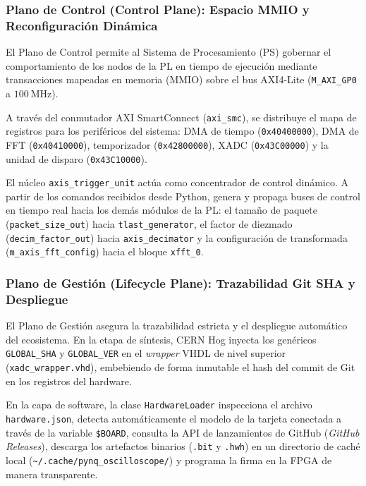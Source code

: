 \documentclass[standalone]{subfiles}
\begin{document}
\subsubsection{Plano de Control (Control Plane): Espacio MMIO y Reconfiguración Dinámica}
\label{subsubsec:plano_control}

El Plano de Control permite al Sistema de Procesamiento (PS) gobernar el comportamiento de los nodos de la PL en tiempo de ejecución mediante transacciones mapeadas en memoria (MMIO) sobre el bus AXI4-Lite (\texttt{M\_AXI\_GP0} a $100~\text{MHz}$). 

A través del conmutador AXI SmartConnect (\texttt{axi\_smc}), se distribuye el mapa de registros para los periféricos del sistema: DMA de tiempo (\texttt{0x40400000}), DMA de FFT (\texttt{0x40410000}), temporizador (\texttt{0x42800000}), XADC (\texttt{0x43C00000}) y la unidad de disparo (\texttt{0x43C10000}).

El núcleo \texttt{axis\_trigger\_unit} actúa como concentrador de control dinámico. A partir de los comandos recibidos desde Python, genera y propaga buses de control en tiempo real hacia los demás módulos de la PL: el tamaño de paquete (\texttt{packet\_size\_out}) hacia \texttt{tlast\_generator}, el factor de diezmado (\texttt{decim\_factor\_out}) hacia \texttt{axis\_decimator} y la configuración de transformada (\texttt{m\_axis\_fft\_config}) hacia el bloque \texttt{xfft\_0}.

\subsubsection{Plano de Gestión (Lifecycle Plane): Trazabilidad Git SHA y Despliegue}
\label{subsubsec:plano_gestion}

El Plano de Gestión asegura la trazabilidad estricta y el despliegue automático del ecosistema. En la etapa de síntesis, CERN Hog inyecta los genéricos \texttt{GLOBAL\_SHA} y \texttt{GLOBAL\_VER} en el \textit{wrapper} VHDL de nivel superior (\texttt{xadc\_wrapper.vhd}), embebiendo de forma inmutable el hash del commit de Git en los registros del hardware.

En la capa de software, la clase \texttt{HardwareLoader} inspecciona el archivo \texttt{hardware.json}, detecta automáticamente el modelo de la tarjeta conectada a través de la variable \texttt{\$BOARD}, consulta la API de lanzamientos de GitHub (\textit{GitHub Releases}), descarga los artefactos binarios (\texttt{.bit} y \texttt{.hwh}) en un directorio de caché local (\texttt{\textasciitilde/.cache/}\allowbreak\texttt{pynq\_oscilloscope/}) y programa la firma en la FPGA de manera transparente.
\end{document}
